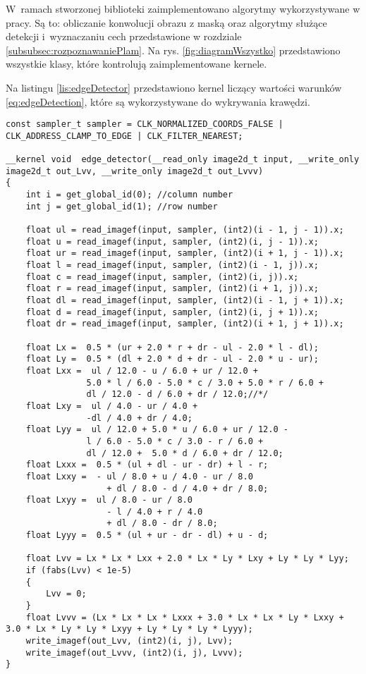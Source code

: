 W~ramach stworzonej biblioteki zaimplementowano algorytmy wykorzystywane w pracy. Są to: obliczanie konwolucji obrazu z maską oraz algorytmy służące detekcji i~wyznaczaniu cech przedstawione w rozdziale \ref{subsubsec:rozpoznawaniePlam}. Na rys. \ref{fig:diagramWszystko} przedstawiono wszystkie klasy, które kontrolują zaimplementowane kernele.

Na listingu \ref{lis:edgeDetector} przedstawiono kernel liczący wartości warunków \ref{eq:edgeDetection}, które są wykorzystywane do wykrywania krawędzi. 

\begin{lstlisting}
const sampler_t sampler = CLK_NORMALIZED_COORDS_FALSE | CLK_ADDRESS_CLAMP_TO_EDGE | CLK_FILTER_NEAREST;

__kernel void  edge_detector(__read_only image2d_t input, __write_only image2d_t out_Lvv, __write_only image2d_t out_Lvvv)
{
	int i = get_global_id(0); //column number
	int j = get_global_id(1); //row number

	float ul = read_imagef(input, sampler, (int2)(i - 1, j - 1)).x;
	float u = read_imagef(input, sampler, (int2)(i, j - 1)).x;
	float ur = read_imagef(input, sampler, (int2)(i + 1, j - 1)).x;
	float l = read_imagef(input, sampler, (int2)(i - 1, j)).x;
	float c = read_imagef(input, sampler, (int2)(i, j)).x;
	float r = read_imagef(input, sampler, (int2)(i + 1, j)).x;
	float dl = read_imagef(input, sampler, (int2)(i - 1, j + 1)).x;
	float d = read_imagef(input, sampler, (int2)(i, j + 1)).x;
	float dr = read_imagef(input, sampler, (int2)(i + 1, j + 1)).x;

	float Lx =  0.5 * (ur + 2.0 * r + dr - ul - 2.0 * l - dl);
	float Ly =  0.5 * (dl + 2.0 * d + dr - ul - 2.0 * u - ur);
	float Lxx =  ul / 12.0 - u / 6.0 + ur / 12.0 +
                5.0 * l / 6.0 - 5.0 * c / 3.0 + 5.0 * r / 6.0 +
				dl / 12.0 - d / 6.0 + dr / 12.0;//*/
	float Lxy =  ul / 4.0 - ur / 4.0 +
				-dl / 4.0 + dr / 4.0;
	float Lyy =  ul / 12.0 + 5.0 * u / 6.0 + ur / 12.0 -
                l / 6.0 - 5.0 * c / 3.0 - r / 6.0 +
				dl / 12.0 +  5.0 * d / 6.0 + dr / 12.0;
	float Lxxx =  0.5 * (ul + dl - ur - dr) + l - r;
	float Lxxy =  - ul / 8.0 + u / 4.0 - ur / 8.0
					+ dl / 8.0 - d / 4.0 + dr / 8.0;
	float Lxyy =  ul / 8.0 - ur / 8.0
					- l / 4.0 + r / 4.0
					+ dl / 8.0 - dr / 8.0;
	float Lyyy =  0.5 * (ul + ur - dr - dl) + u - d;
	
	float Lvv = Lx * Lx * Lxx + 2.0 * Lx * Ly * Lxy + Ly * Ly * Lyy;
	if (fabs(Lvv) < 1e-5)
	{
		Lvv = 0;
	}
	float Lvvv = (Lx * Lx * Lx * Lxxx + 3.0 * Lx * Lx * Ly * Lxxy + 3.0 * Lx * Ly * Ly * Lxyy + Ly * Ly * Ly * Lyyy);
	write_imagef(out_Lvv, (int2)(i, j), Lvv);
	write_imagef(out_Lvvv, (int2)(i, j), Lvvv);
}
\end{lstlisting}

